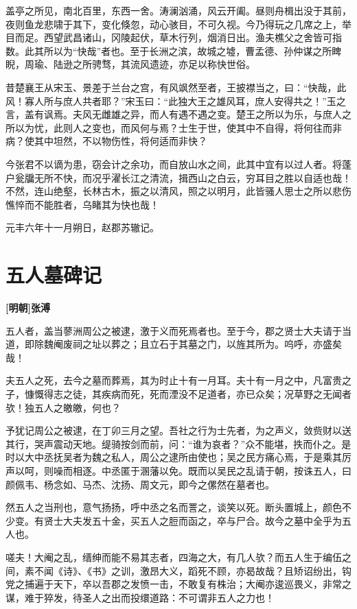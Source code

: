 \documentclass[UTF8,titlepage,oneside]{ctexbook}
\begin{document}
盖亭之所见，南北百里，东西一舍。涛澜汹涌，风云开阖。昼则舟楫出没于其前，夜则鱼龙悲啸于其下，变化倏忽，动心骇目，不可久视。今乃得玩之几席之上，举目而足。西望武昌诸山，冈陵起伏，草木行列，烟消日出。渔夫樵父之舍皆可指数。此其所以为“快哉”者也。至于长洲之滨，故城之墟，曹孟德、孙仲谋之所睥睨，周瑜、陆逊之所骋骛，其流风遗迹，亦足以称快世俗。


昔楚襄王从宋玉、景差于兰台之宫，有风飒然至者，王披襟当之，曰：“快哉，此风！寡人所与庶人共者耶？”宋玉曰：“此独大王之雄风耳，庶人安得共之！”玉之言，盖有讽焉。夫风无雌雄之异，而人有遇不遇之变。楚王之所以为乐，与庶人之所以为忧，此则人之变也，而风何与焉？士生于世，使其中不自得，将何往而非病？使其中坦然，不以物伤性，将何适而非快？


今张君不以谪为患，窃会计之余功，而自放山水之间，此其中宜有以过人者。将蓬户瓮牖无所不快，而况乎濯长江之清流，揖西山之白云，穷耳目之胜以自适也哉！不然，连山绝壑，长林古木，振之以清风，照之以明月，此皆骚人思士之所以悲伤憔悴而不能胜者，乌睹其为快也哉！


元丰六年十一月朔日，赵郡苏辙记。



\chapter*{五人墓碑记}
\begin{center}
	\textbf{[明朝]张溥}
\end{center}

五人者，盖当蓼洲周公之被逮，激于义而死焉者也。至于今，郡之贤士大夫请于当道，即除魏阉废祠之址以葬之；且立石于其墓之门，以旌其所为。呜呼，亦盛矣哉！


夫五人之死，去今之墓而葬焉，其为时止十有一月耳。夫十有一月之中，凡富贵之子，慷慨得志之徒，其疾病而死，死而湮没不足道者，亦已众矣；况草野之无闻者欤！独五人之皦皦，何也？


予犹记周公之被逮，在丁卯三月之望。吾社之行为士先者，为之声义，敛赀财以送其行，哭声震动天地。缇骑按剑而前，问：“谁为哀者？”众不能堪，抶而仆之。是时以大中丞抚吴者为魏之私人，周公之逮所由使也；吴之民方痛心焉，于是乘其厉声以呵，则噪而相逐。中丞匿于溷藩以免。既而以吴民之乱请于朝，按诛五人，曰颜佩韦、杨念如、马杰、沈扬、周文元，即今之傫然在墓者也。


然五人之当刑也，意气扬扬，呼中丞之名而詈之，谈笑以死。断头置城上，颜色不少变。有贤士大夫发五十金，买五人之脰而函之，卒与尸合。故今之墓中全乎为五人也。


嗟夫！大阉之乱，缙绅而能不易其志者，四海之大，有几人欤？而五人生于编伍之间，素不闻《诗》、《书》之训，激昂大义，蹈死不顾，亦曷故哉？且矫诏纷出，钩党之捕遍于天下，卒以吾郡之发愤一击，不敢复有株治；大阉亦逡巡畏义，非常之谋，难于猝发，待圣人之出而投缳道路：不可谓非五人之力也！
\end{document}
